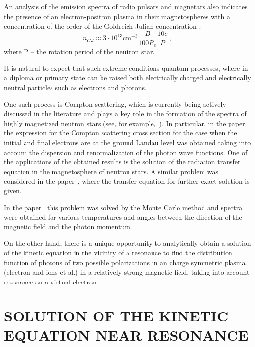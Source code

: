 \documentclass[
aps,%
12pt,%
final,%
notitlepage,%
oneside,%
onecolumn,%
nobibnotes,%
nofootinbib,%
superscriptaddress,%
noshowpacs,%
centertags]%
{revtex4}
\begin{document}
An analysis of the emission spectra of radio pulsars and magnetars also indicates the presence of an electron-positron plasma in their magnetospheres with a concentration of the order of the Goldreich-Julian concentration \cite{Goldreich:1969}:
\begin{equation}
n_{GJ}\approx 3 \cdot 10^{13} \text{cm}^{-3} \frac{B}{100B_e} \frac{10 c}{P}\, ,
\end{equation}
where P -- the rotation period of the neutron star.

It is natural to expect that such extreme
conditions
quantum processes, where in a diploma or primary
state can be raised both electrically
charged and electrically neutral particles such as electrons and photons.

One such process is Compton scattering, which is currently being actively discussed in the literature and plays a key role in the formation of the spectra of highly magnetized neutron stars (see, for example,~\cite{Suleimanov:2007it,RCh09}).
In particular, in the paper~\cite{RCh09} the expression for the Compton scattering cross section for the case when the initial and final electrons are at the ground Landau level was obtained taking into account the dispersion and renormalization of the photon wave functions. One of the applications of the obtained results is the solution of the radiation transfer equation in the magnetosphere of neutron stars. A similar problem was considered in the paper~\cite{Mushtukov:2016}, where the transfer equation for further exact solution is given.

In the paper~\cite{Mushtukov:2022} this problem was solved by the Monte Carlo method and spectra were obtained for various temperatures and angles between the direction of the magnetic field and the photon momentum.

On the other hand, there is a unique opportunity to analytically obtain a solution of the kinetic equation in the vicinity of a resonance to find the distribution function of photons of two possible polarizations in an charge symmetric plasma (electron and ions et al.) in a relatively strong magnetic field, taking into account resonance on a virtual electron.

\section{\uppercase{Solution of the kinetic equation near resonance}}
\end{document}
